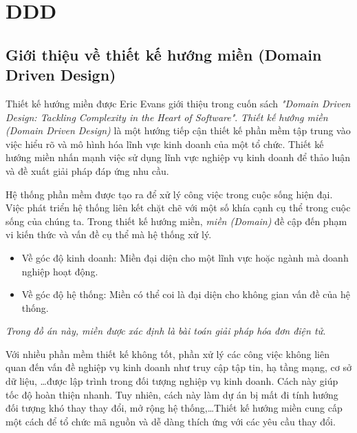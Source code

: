 \chapter{DDD}

\section{Giới thiệu về thiết kế hướng miền (Domain Driven Design)}

Thiết kế hướng miền được Eric Evans giới thiệu trong cuốn sách \emph{"Domain Driven Design: Tackling Complexity in the Heart of Software"}. \emph{Thiết kế hướng miền (Domain Driven Design)} là một hướng tiếp cận thiết kế phần mềm tập trung vào việc hiểu rõ và mô hình hóa lĩnh vực kinh doanh của một tổ chức. Thiết kế hướng miền nhấn mạnh việc sử dụng lĩnh vực nghiệp vụ kinh doanh để thảo luận và đề xuất giải pháp đáp ứng nhu cầu.

Hệ thống phần mềm được tạo ra để xử lý công việc trong cuộc sống hiện đại. Việc phát triển hệ thống liên kết chặt chẽ với một số khía cạnh cụ thể trong cuộc sống của chúng ta. Trong thiết kế hướng miền, \emph{miền (Domain)} đề cập đến phạm vi kiến thức và vấn đề cụ thể mà hệ thống xử lý.

\begin{itemize}

\item Về góc độ kinh doanh: Miền đại diện cho một lĩnh vực hoặc ngành mà doanh nghiệp hoạt động.

\item Về góc độ hệ thống: Miền có thể coi là đại diện cho không gian vấn đề của hệ thống.

\end{itemize}

\begin{example} \emph{Trong đồ án này, miền được xác định là bài toán giải pháp hóa đơn điện tử.}

\end{example}

Với nhiều phần mềm thiết kế không tốt, phần xử lý các công việc không liên quan đến vấn đề nghiệp vụ kinh doanh như truy cập tập tin, hạ tầng mạng, cơ sở dữ liệu, \dots được lập trình trong đối tượng nghiệp vụ kinh doanh. Cách này giúp tốc độ hoàn thiện nhanh. Tuy nhiên, cách này làm dự án bị mất đi tính hướng đối tượng khó thay thay đổi, mở rộng hệ thống,\dots Thiết kế hướng miền cung cấp một cách để tổ chức mã nguồn và dễ dàng thích ứng với các yêu cầu thay đổi.

